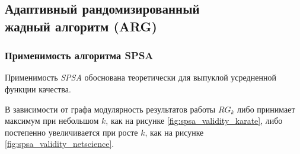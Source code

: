 \subsection{Адаптивный рандомизированный\\ жадный алгоритм (ARG)}
\label{sub:arg}


\subsubsection*{Применимость алгоритма SPSA}
\label{ssub:spsa_validity}

Применимость \emph{SPSA} обоснована теоретически для выпуклой усредненной функции качества.

В зависимости от графа модулярность результатов работы $RG_k$ либо принимает максимум при небольшом $k$, как на рисунке \ref{fig:spsa_validity_karate}, либо постепенно увеличивается при росте $k$, как на рисунке \ref{fig:spsa_validity_netscience}.

